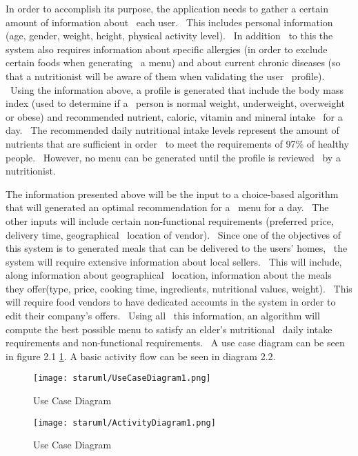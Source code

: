 In order to accomplish its purpose, the application needs to gather a certain amount of information about \
each user. \
This includes personal information (age, gender, weight, height, physical activity level). \
In addition \
to this the system also requires information about specific allergies (in order to exclude certain foods when generating \
a menu) and about current chronic diseases (so that a nutritionist will be aware of them when validating the user \
profile). \
Using the information above, a profile is generated that include the body mass index (used to determine if a \
person is normal weight, underweight, overweight or obese) and recommended nutrient, caloric, vitamin and mineral intake \
for a day. \
The recommended daily nutritional intake levels represent the amount of nutrients that are sufficient in order \
to meet the requirements of 97\% of healthy people. \
However, no menu can be generated until the profile is reviewed \
by a nutritionist.

The information presented above will be the input to a choice-based algorithm that will generated an optimal recommendation for a \
menu for a day. \
The other inputs will include certain non-functional requirements (preferred price, delivery time, geographical \
location of vendor). \
Since one of the objectives of this system is to generated meals that can be delivered to the users' homes, \
the system will require extensive information about local sellers. \
This will include, along information about geographical \
location, information about the meals they offer(type, price, cooking time, ingredients, nutritional values, weight). \
This will require food vendors to have dedicated accounts in the system in order to edit their company's offers. \
Using all \
this information, an algorithm will compute the best possible menu to satisfy an elder's nutritional \
daily intake requirements and non-functional requirements. \
A use case diagram can be seen in figure 2.1 \ref{fig:usecase1}.
A basic activity flow can be seen in diagram 2.2.

\begin{figure}[ht]
    \label{fig:usecase1}
    \texttt{[image: staruml/UseCaseDiagram1.png]}
    \caption{Use Case Diagram}
\end{figure}

\begin{figure}[ht]
    \label{fig:activity1}
    \texttt{[image: staruml/ActivityDiagram1.png]}
    \caption{Use Case Diagram}
\end{figure}

